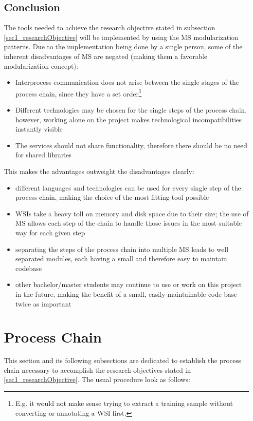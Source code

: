 \subsection{Conclusion}	
The tools needed to achieve the research objective stated in subsection \ref{sec1_researchObjective} will be implemented by using the MS modularization patterns. Due to the implementation being done by a single person, some of the inherent disadvantages of MS are negated (making them a favorable modularization concept):
\begin{itemize}
	\item Interprocess communication does not arise between the single stages of the process chain, since they have a set order\footnote{E.g. it would not make sense trying to extract a training sample without converting or annotating a WSI first.}
	\item Different technologies may be chosen for the single steps of the process chain, however, working alone on the project makes technological incompatibilities instantly visible
	\item The services should not share functionality, therefore there should be no need for shared libraries
\end{itemize}
This makes the advantages outweight the disadvantages clearly:
\begin{itemize}
	\item different languages and technologies can be used for every single step of the process chain, making the choice of the most fitting tool possible
	\item WSIs take a heavy toll on memory and disk space due to their size; the use of MS allows each step of the chain to handle those issues in the most suitable way for each given step
	\item separating the steps of the process chain into multiple MS leads to well separated modules, each having a small and therefore easy to maintain codebase
	\item other bachelor/master students may continue to use or work on this project in the future, making the benefit of a small, easily maintainable code base twice as important
\end{itemize}


\section{Process Chain}
\label{sec2_pc}
This section and its following subsections are dedicated to establish the process chain necessary to accomplish the research objectives stated in \ref{sec1_researchObjective}. The usual procedure look as follows:

